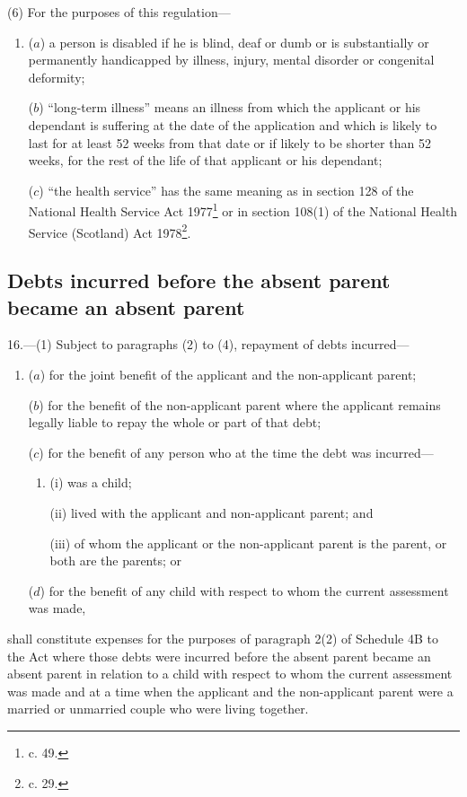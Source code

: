 \documentclass[12pt,a4paper]{article}
\begin{document}
(6) For the purposes of this regulation—
\begin{enumerate}\item[]
($a$) a person is disabled if he is blind, deaf or dumb or is substantially or
permanently handicapped by illness, injury, mental disorder or congenital
deformity;

($b$) “long-term illness” means an illness from which the applicant or his
dependant is suffering at the date of the application and which is likely to
last for at least 52 weeks from that date or if likely to be shorter than 52
weeks, for the rest of the life of that applicant or his dependant;

($c$) “the health service” has the same meaning as in section 128 of the National
Health Service Act 1977\footnote{ c. 49.} or in section 108(1) of the National Health Service
(Scotland) Act 1978\footnote{ c. 29.}.
\end{enumerate}


\subsection[16. Debts incurred before the absent parent became an absent parent]{Debts incurred before the absent parent became an absent parent}

16.—(1) Subject
to paragraphs (2) to (4), repayment of debts incurred—
\begin{enumerate}\item[]
($a$) for the joint benefit of the applicant and the non-applicant parent;

($b$) for the benefit of the non-applicant parent where the applicant remains
legally liable to repay the whole or part of that debt;

($c$) for the benefit of any person who at the time the debt was incurred—
\begin{enumerate}\item[]
(i) was a child;

(ii) lived with the applicant and non-applicant parent; and

(iii) of whom the applicant or the non-applicant parent is the parent, or both
are the parents; or
\end{enumerate}

($d$) for the benefit of any child with respect to whom the current assessment was
made,
\end{enumerate}
shall constitute expenses for the purposes of paragraph 2(2) of Schedule 4B to
the Act where those debts were incurred before the absent parent became an
absent parent in relation to a child with respect to whom the current assessment
was made and at a time when the applicant and the non-applicant parent were a
married or unmarried couple who were living together.
\end{document}
